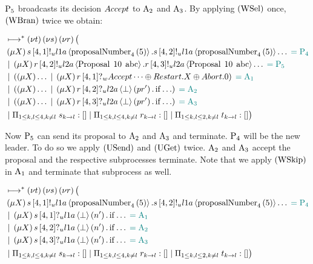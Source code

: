 $\Proposer{5}$ broadcasts its decision $\Accept$ to $\Acceptor{2}$ and $\Acceptor{3}$.
By applying $\RWsel$ once, $\RWbran$ twice we obtain:

\begin{align*}
&\mapstostar \NuChannels \big (\\
&\Mu{X} \SendUnreliableP{s}{4}{1}{\LOneA}{\proposalNumber{5}{4}}.\SendUnreliableP{s}{4}{2}{\LOneA}{\proposalNumber{5}{4}}\dots \comment{= \Proposer{4}}\\
&\Or \Mu{X} \SendUnreliableP{r}{4}{2}{\LTwoA}{\ProposalC{10}{\ABC}}.\SendUnreliableP{r}{4}{3}{\LTwoA}{\ProposalC{10}{\ABC}}\dots \comment{= \Proposer{5}}\\
&\Or \Paren{
    \Mu{X} \dots
    \Or \Mu{X} \ReceiveWeaklyP{r}{4}{1}{\BeginPaCont}
} \comment{= \Acceptor{1}}\\
&\Or \Paren{
    \Mu{X} \dots
    \Or \Mu{X} \ReceiveUnreliableP{r}{4}{2}{\LTwoA}{\bot}{pr'}.\If{\dots}
} \comment{= \Acceptor{2}}\\
&\Or \Paren{
    \Mu{X} \dots
    \Or \Mu{X} \ReceiveUnreliableP{r}{4}{3}{\LTwoA}{\bot}{pr'}.\If{\dots}
} \comment{= \Acceptor{3}}\\
&\Or \InnerSessionQueues{s}
\Or \InnerSessionQueues{r}
\Or \OuterSessionQueues
\big )
\end{align*}

Now $\Proposer{5}$ can send its proposal to $\Acceptor{2}$ and $\Acceptor{3}$ and terminate.
$\Proposer{4}$ will be the new leader.
To do so we apply $\RUsend$ and $\RUget$ twice.
$\Acceptor{2}$ and $\Acceptor{3}$ accept the proposal and the respective subprocesses terminate.
Note that we apply $\RWskip$ in $\Acceptor{1}$ and terminate that subprocess as well.

\begin{align*}
&\mapstostar \NuChannels \big (\\
&\Mu{X} \SendUnreliableP{s}{4}{1}{\LOneA}{\proposalNumber{5}{4}}.\SendUnreliableP{s}{4}{2}{\LOneA}{\proposalNumber{5}{4}}\dots \comment{= \Proposer{4}}\\
&\Or \Mu{X} \ReceiveUnreliableP{s}{4}{1}{\LOneA}{\bot}{n'}.\If{\dots} \comment{= \Acceptor{1}}\\
&\Or \Mu{X} \ReceiveUnreliableP{s}{4}{2}{\LOneA}{\bot}{n'}.\If{\dots} \comment{= \Acceptor{2}}\\
&\Or \Mu{X} \ReceiveUnreliableP{s}{4}{3}{\LOneA}{\bot}{n'}.\If{\dots} \comment{= \Acceptor{3}}\\
&\Or \InnerSessionQueues{s}
\Or \InnerSessionQueues{r}
\Or \OuterSessionQueues
\big )
\end{align*}

